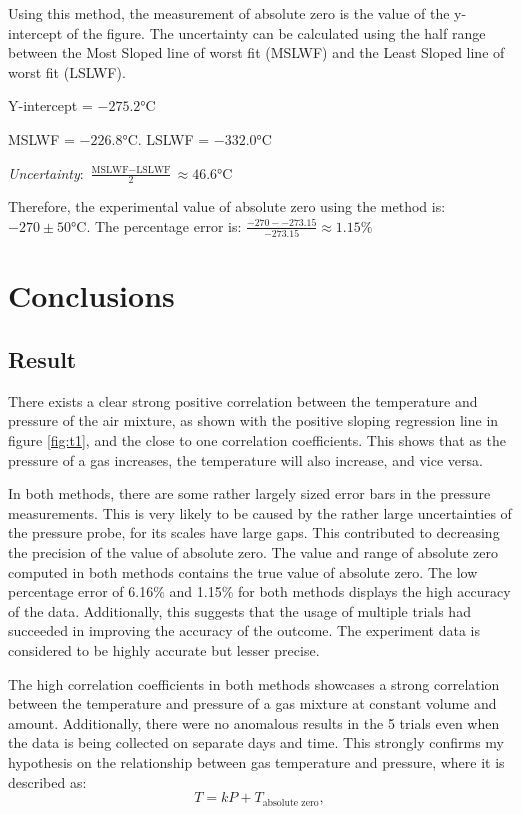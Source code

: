 \documentclass[a4paper,12pt]{article}
\begin{document}
Using this method, the measurement of absolute zero is the value of the y-intercept of the figure. The uncertainty can be calculated using the half range between the Most Sloped line of worst fit (MSLWF) and the Least Sloped line of worst fit (LSLWF).

Y-intercept = $-275.2\si{\celsius}$

MSLWF = $-226.8\si{\celsius}$. LSLWF = $-332.0\si{\celsius}$

\textit{Uncertainty}: $\frac{\text{MSLWF} - \text{LSLWF}}{2} \approx 46.6 \si{\celsius}$

Therefore, the experimental value of absolute zero using the method is: $-270 \pm 50 \si{\celsius}$. The percentage error is: $\frac{-270 - -273.15}{-273.15} \approx 1.15\%$

\section{Conclusions}
\subsection{Result}
There exists a clear strong positive correlation between the temperature and pressure of the air mixture, as shown with the positive sloping regression line in figure \ref{fig:t1}, and the close to one correlation coefficients. This shows that as the pressure of a gas increases, the temperature will also increase, and vice versa.

In both methods, there are some rather largely sized error bars in the pressure measurements. This is very likely to be caused by the rather large uncertainties of the pressure probe, for its scales have large gaps. This contributed to decreasing the precision of the value of absolute zero.
The value and range of absolute zero computed in both methods contains the true value of absolute zero. The low percentage error of 6.16\% and 1.15\% for both methods displays the high accuracy of the data. Additionally, this suggests that the usage of multiple trials had succeeded in improving the accuracy of the outcome. The experiment data is considered to be highly accurate but lesser precise.

The high correlation coefficients in both methods showcases a strong correlation between the temperature and pressure of a gas mixture at constant volume and amount. Additionally, there were no anomalous results in the 5 trials even when the data is being collected on separate days and time. This strongly confirms my hypothesis on the relationship between gas temperature and pressure, where it is described as:
\[
    T = kP + T_{\text{absolute zero}},
\]
\end{document}
